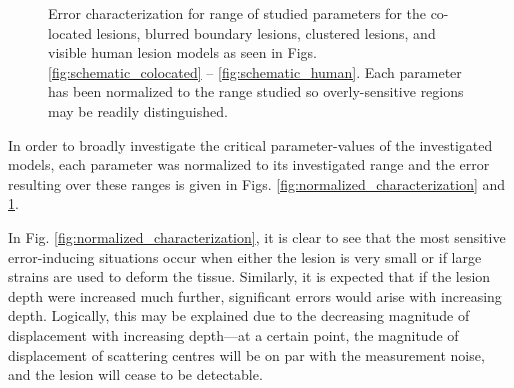 			\begin{figure}[!htb]
				\centering
				\caption[Error characterization for: co-located, blurred boundary, clustered, and visible human lesion models]{Error characterization for range of studied parameters for the co-located lesions, blurred boundary lesions, clustered lesions, and visible human lesion models as seen in Figs. \ref{fig:schematic_colocated} -- \ref{fig:schematic_human}. Each parameter has been normalized to the range studied so overly-sensitive regions may be readily distinguished.}
				\label{fig:normalized_characterization_extras}
			\end{figure}

			In order to broadly investigate the critical parameter-values of the investigated models, each parameter was normalized to its investigated range and the error resulting over these ranges is given in Figs. \ref{fig:normalized_characterization} and \ref{fig:normalized_characterization_extras}.

			In Fig. \ref{fig:normalized_characterization}, it is clear to see that the most sensitive error-inducing situations occur when either the lesion is very small or if large strains are used to deform the tissue. Similarly, it is expected that if the lesion depth were increased much further, significant errors would arise with increasing depth. Logically, this may be explained due to the decreasing magnitude of displacement with increasing depth---at a certain point, the magnitude of displacement of scattering centres will be on par with the measurement noise, and the lesion will cease to be detectable.

